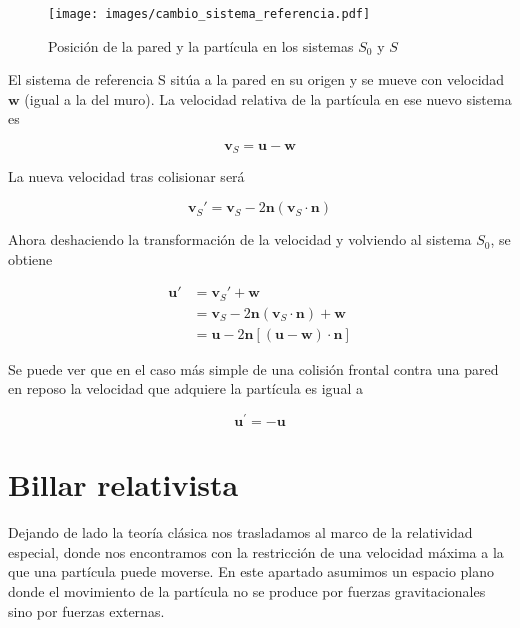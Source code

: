 \begin{figure}[H]
    \centering
    \texttt{[image: images/cambio\_sistema\_referencia.pdf]}
    \caption{Posición de la pared y la partícula en los sistemas $S_0$ y $S$}
    \label{fig:cambio_referencia}
\end{figure}

\vspace{3mm}

El sistema de referencia S sitúa a la pared en su origen y se mueve con velocidad \( \mathbf{w} \) (igual a la del muro). La velocidad relativa de la partícula en ese nuevo sistema es

\begin{equation}
    \mathbf{v}_S = \mathbf{u} - \mathbf{w}
\end{equation}

La nueva velocidad tras colisionar será

\begin{equation}
    \mathbf{v}_S' = \mathbf{v}_S - 2\mathbf{n}(\mathbf{v}_S \cdot \mathbf{n})
\end{equation}

Ahora deshaciendo la transformación de la velocidad y volviendo al sistema \( S_0 \), se obtiene

\begin{align}
    \mathbf{u}' &= \mathbf{v}_S' + \mathbf{w} \\
    &= \mathbf{v}_S - 2\mathbf{n}(\mathbf{v}_S \cdot \mathbf{n}) + \mathbf{w} \\
    &= \mathbf{u} - 2\mathbf{n}\left[(\mathbf{u} - \mathbf{w}) \cdot \mathbf{n}\right]
\end{align}

\vspace{3mm}

Se puede ver que en el caso más simple de una colisión frontal contra una pared en reposo la velocidad que adquiere la partícula es igual a 

\begin{equation}\label{eq:velocidad_inversa_clasica}
    \mathbf{u}^\prime = - \mathbf{u}
\end{equation}

\section{Billar relativista}

Dejando de lado la teoría clásica nos trasladamos al marco de la relatividad especial, donde nos encontramos con la restricción de una velocidad máxima a la que una partícula puede moverse. En este apartado asumimos un espacio plano donde el movimiento de la partícula no se produce por fuerzas gravitacionales sino por fuerzas externas. 

